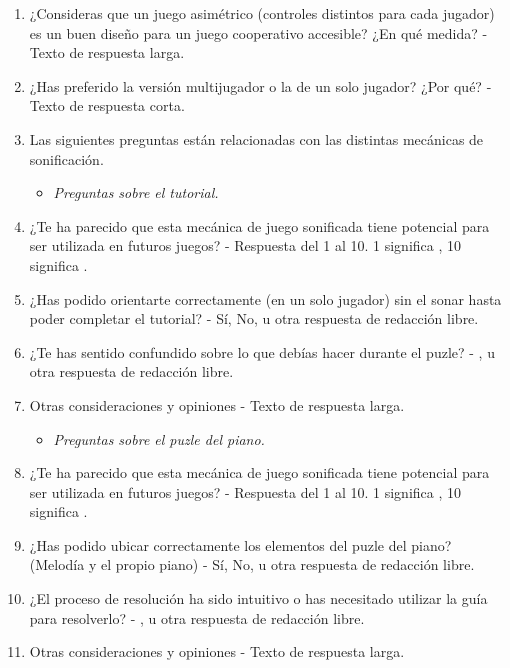 \begin{enumerate}
	\item ¿Consideras que un juego asimétrico (controles distintos para cada jugador) es un buen diseño para un juego cooperativo accesible? ¿En qué medida?
	\subitem- Texto de respuesta larga.
	\item ¿Has preferido la versión multijugador o la de un solo jugador? ¿Por qué?
	\subitem- Texto de respuesta corta.
	\item[$\blacksquare$] Las siguientes preguntas están relacionadas con las distintas mecánicas de sonificación.
	\begin{itemize}
		\item \textit{Preguntas sobre el tutorial.}
	\end{itemize}
	\item ¿Te ha parecido que esta mecánica de juego sonificada tiene potencial para ser utilizada en futuros juegos?
	\subitem- Respuesta del 1 al 10. 1 significa , 10 significa .
	\item ¿Has podido orientarte correctamente (en un solo jugador) sin el sonar hasta poder completar el tutorial?
	\subitem- Sí, No, u otra respuesta de redacción libre.
	\item ¿Te has sentido confundido sobre lo que debías hacer durante el puzle?
	\subitem- ,  u otra respuesta de redacción libre.
	\item Otras consideraciones y opiniones
	\subitem- Texto de respuesta larga.
	\begin{itemize}
		\item \textit{Preguntas sobre el puzle del piano.}
	\end{itemize}
	\item ¿Te ha parecido que esta mecánica de juego sonificada tiene potencial para ser utilizada en futuros juegos?
	\subitem- Respuesta del 1 al 10. 1 significa , 10 significa .
	\item ¿Has podido ubicar correctamente los elementos del puzle del piano? (Melodía y el propio piano)
	\subitem- Sí, No, u otra respuesta de redacción libre.
	\item ¿El proceso de resolución ha sido intuitivo o has necesitado utilizar la guía para resolverlo?
	\subitem- ,  u otra respuesta de redacción libre.
	\item Otras consideraciones y opiniones
	\subitem- Texto de respuesta larga.

\end{enumerate}
